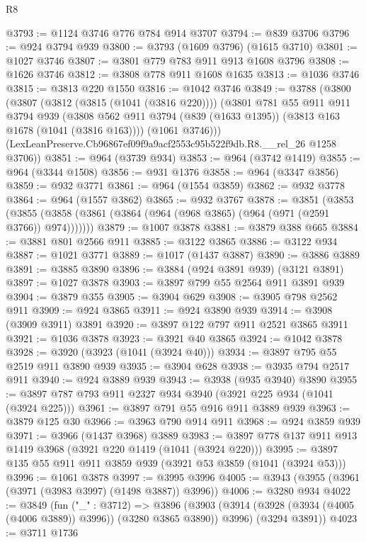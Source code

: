 \begin{lexlean}{R8}
\begin{coremodule}
@3793 := @1124 @3746 @776 @784 @914 @3707
@3794 := @839 @3706
@3796 := @924 @3794 @939
@3800 := @3793 (@1609 @3796) (@1615 @3710)
@3801 := @1027 @3746
@3807 := @3801 @779 @783 @911 @913 @1608 @3796
@3808 := @1626 @3746
@3812 := @3808 @778 @911 @1608 @1635
@3813 := @1036 @3746
@3815 := @3813 @220 @1550
@3816 := @1042 @3746
@3849 := @3788
    (@3800
      (@3807
        (@3812 (@3815 (@1041 (@3816 @220))))
        (@3801
          @781
          @55
          @911
          @911
          @3794
          @939
          (@3808 @562 @911 @3794 (@839 (@1633 @1395)) (@3813 @163 @1678 (@1041 (@3816 @163))))
          (@1061 @3746)))
      (LexLeanPreserve.Cb96867ef09f9a9acf2553c95b522f9db.R8.__rel_26 @1258 @3706))
@3851 := @964 (@3739 @934)
@3853 := @964 (@3742 @1419)
@3855 := @964 (@3344 @1508)
@3856 := @931 @1376
@3858 := @964 (@3347 @3856)
@3859 := @932 @3771
@3861 := @964 (@1554 @3859)
@3862 := @932 @3778
@3864 := @964 (@1557 @3862)
@3865 := @932 @3767
@3878 := @3851
    (@3853 (@3855 (@3858 (@3861 (@3864 (@964 (@968 @3865) (@964 (@971 (@2591 @3766)) @974)))))))
@3879 := @1007 @3878
@3881 := @3879 @388 @665
@3884 := @3881 @801 @2566 @911
@3885 := @3122 @3865
@3886 := @3122 @934
@3887 := @1021 @3771
@3889 := @1017 (@1437 @3887)
@3890 := @3886 @3889
@3891 := @3885 @3890
@3896 := @3884 (@924 @3891 @939) (@3121 @3891)
@3897 := @1027 @3878
@3903 := @3897 @799 @55 @2564 @911 @3891 @939
@3904 := @3879 @355
@3905 := @3904 @629
@3908 := @3905 @798 @2562 @911
@3909 := @924 @3865
@3911 := @924 @3890 @939
@3914 := @3908 (@3909 @3911) @3891
@3920 := @3897 @122 @797 @911 @2521 @3865 @3911
@3921 := @1036 @3878
@3923 := @3921 @40 @3865
@3924 := @1042 @3878
@3928 := @3920 (@3923 (@1041 (@3924 @40)))
@3934 := @3897 @795 @55 @2519 @911 @3890 @939
@3935 := @3904 @628
@3938 := @3935 @794 @2517 @911
@3940 := @924 @3889 @939
@3943 := @3938 (@935 @3940) @3890
@3955 := @3897 @787 @793 @911 @2327 @934 @3940 (@3921 @225 @934 (@1041 (@3924 @225)))
@3961 := @3897 @791 @55 @916 @911 @3889 @939
@3963 := @3879 @125 @30
@3966 := @3963 @790 @914 @911
@3968 := @924 @3859 @939
@3971 := @3966 (@1437 @3968) @3889
@3983 := @3897 @778 @137 @911 @913 @1419 @3968 (@3921 @220 @1419 (@1041 (@3924 @220)))
@3995 := @3897 @135 @55 @911 @911 @3859 @939 (@3921 @53 @3859 (@1041 (@3924 @53)))
@3996 := @1061 @3878
@3997 := @3995 @3996
@4005 := @3943 (@3955 (@3961 (@3971 (@3983 @3997) (@1498 @3887)) @3996))
@4006 := @3280 @934
@4022 := @3849
    (fun ("_" : @3712) =>
    @3896
      (@3903 (@3914 (@3928 (@3934 (@4005 (@4006 @3889)) @3996)) (@3280 @3865 @3890)) @3996)
      (@3294 @3891))
@4023 := @3711 @1736

\end{coremodule}
\end{lexlean}
